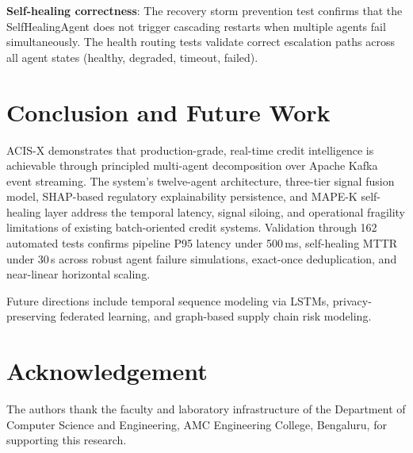 \documentclass[runningheads]{llncs}
\begin{document}
\textbf{Self-healing correctness}: The recovery storm prevention test confirms that the SelfHealingAgent does not trigger cascading restarts when multiple agents fail simultaneously. The health routing tests validate correct escalation paths across all agent states (healthy, degraded, timeout, failed).


\section{Conclusion and Future Work}
\label{sec:conclusion}

ACIS-X demonstrates that production-grade, real-time credit intelligence is achievable through principled multi-agent decomposition over Apache Kafka event streaming. The system's twelve-agent architecture, three-tier signal fusion model, SHAP-based regulatory explainability persistence, and MAPE-K self-healing layer address the temporal latency, signal siloing, and operational fragility limitations of existing batch-oriented credit systems. Validation through 162 automated tests confirms pipeline P95 latency under 500\,ms, self-healing MTTR under 30\,s across robust agent failure simulations, exact-once deduplication, and near-linear horizontal scaling.

Future directions include temporal sequence modeling via LSTMs, privacy-preserving federated learning, and graph-based supply chain risk modeling.

\section*{Acknowledgement}
The authors thank the faculty and laboratory infrastructure of the Department of Computer Science and Engineering, AMC Engineering College, Bengaluru, for supporting this research.
\end{document}
